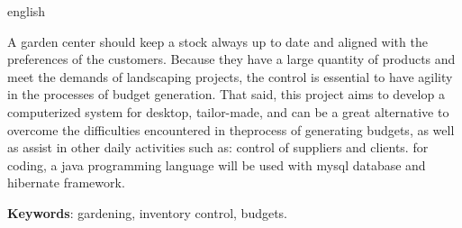 \begin{resumo}[Abstract]
	\begin{otherlanguage*}{english}
		
		


A garden center should keep a stock always up to date and aligned with the preferences of the customers.
Because they have a large quantity of products and meet the demands of landscaping projects, the control is essential to have agility in the processes of budget generation.
That said, this project aims to develop a computerized system for desktop, tailor-made, and can be a great alternative to overcome the difficulties encountered in theprocess of generating budgets, as well as assist in other daily activities such as: control of suppliers and clients.
for coding, a java programming language will be used with mysql database and hibernate framework.



		
		
		
		\vspace{\onelineskip}
		
		\noindent 
		\textbf{Keywords}: gardening, inventory control, budgets.
	\end{otherlanguage*}
\end{resumo}